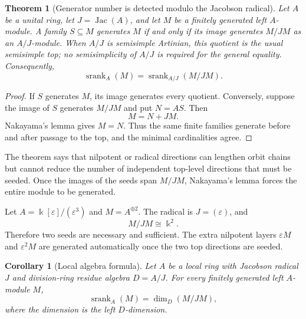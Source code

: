 \documentclass[11pt]{article}
\newtheorem{theorem}{Theorem}[section]
\newtheorem{corollary}[corollary]{Corollary}
\theoremstyle{definition}
\theoremstyle{remark}
\theoremstyle{definition}\newtheorem{example}[theorem]{Example}
\newcommand{\bbk}{\Bbbk}
\newcommand{\srank}{\operatorname{srank}}
\newcommand{\Jac}{\operatorname{Jac}}
\newcommand{\RecordID}[1]{\label{record:#1}}
\newcommand{\Depends}[1]{}
\newcommand{\Exports}[1]{}
\begin{document}
\begin{theorem}[Generator number is detected modulo the Jacobson radical]
\label{thm:module-top}
Let $A$ be a unital ring, let $J=\Jac(A)$, and let $M$ be a finitely generated left $A$-module.  A family $S\subseteq M$ generates $M$ if and only if its image generates $M/JM$ as an $A/J$-module.  When $A/J$ is semisimple Artinian, this quotient is the usual semisimple top; no semisimplicity of $A/J$ is required for the general equality.  Consequently,
\[
\boxed{
\srank_A(M)=\srank_{A/J}(M/JM).
}
\]
\end{theorem}
\RecordID{PSC-I-T-MODULE-TOP}
\Depends{PSC-I-CI-NAKAYAMA and PSC-I-T-QUOTIENT-MONOTONICITY.}
\Exports{Finite-dimensional generator formulas, quantum multiplicity calculations, and residual deformation modules.}

\begin{proof}
If $S$ generates $M$, its image generates every quotient.  Conversely, suppose the image of $S$ generates $M/JM$ and put $N=AS$.  Then
\[
M=N+JM.
\]
Nakayama's lemma gives $M=N$.  Thus the same finite families generate before and after passage to the top, and the minimal cardinalities agree.
\end{proof}

\begin{interpretation}
The theorem says that nilpotent or radical directions can lengthen orbit chains but cannot reduce the number of independent top-level directions that must be seeded.  Once the images of the seeds span \(M/JM\), Nakayama's lemma forces the entire module to be generated.
\end{interpretation}

\begin{microexample}[title={A local nilpotent algebra}]
Let \(A=\bbk[\varepsilon]/(\varepsilon^3)\) and \(M=A^{\oplus2}\).  The radical is \(J=(\varepsilon)\), and
\[
M/JM\cong\bbk^2.
\]
Therefore two seeds are necessary and sufficient.  The extra nilpotent layers \(\varepsilon M\) and \(\varepsilon^2M\) are generated automatically once the two top directions are seeded.
\end{microexample}


\begin{corollary}[Local algebra formula]
\label{cor:local-algebra-formula}
Let $A$ be a local ring with Jacobson radical $J$ and division-ring residue algebra $D=A/J$.  For every finitely generated left $A$-module $M$,
\[
\boxed{
\srank_A(M)=\dim_D(M/JM),
}
\]
where the dimension is the left $D$-dimension.
\end{corollary}
\RecordID{PSC-I-C-LOCAL-ALGEBRA-FORMULA}
\Depends{PSC-I-T-MODULE-TOP.}
\end{document}
